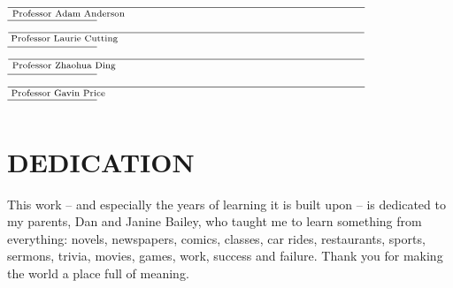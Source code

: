 \documentclass[12pt]{report}  %
\newcommand\tline[2]{$\underset{\text{#1}}{\text{\underline{\hspace{#2}}}}$}
\begin{document}
\begin{titlepage}
\hspace*{0.05in} \tline{Professor Adam Anderson \hspace*{2.6in}}{4.0in} \hskip 0.1in  \tline{}{1.0in} \\[.25in]
\hspace*{.3in} \tline{Professor Laurie Cutting \hspace*{2.7in}}{4.0in} \hskip 0.1in  \tline{}{1.0in} \\[.25in]
\hspace*{0.3in} \tline{Professor Zhaohua Ding \hspace*{2.71in}}{4.0in} \hskip 0.1in \tline{}{1.0in} \\[.25in]
\hspace*{0.3in} \tline{Professor Gavin Price \hspace*{2.83in}}{4.0in} \hskip 0.1in \tline{}{1.0in} 


\end{titlepage}

\doublespacing
{} \setcounter{page}{2}

\chapter*{DEDICATION}
\vspace{7mm}

\begin{changemargin}{1in}{1in} 
    This work -- and especially the years of learning it is built upon -- is dedicated to my parents, Dan and Janine Bailey, who taught me to learn something from everything: novels,  newspapers, comics, classes, car rides, restaurants, sports,   sermons, trivia, movies, games, work, success and failure. Thank you for making the world a place full of meaning.
\end{changemargin} 
\end{document}
